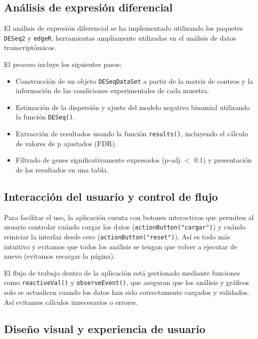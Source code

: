 \subsection{Análisis de expresión diferencial}

El análisis de expresión diferencial se ha implementado utilizando los paquetes \texttt{DESeq2} y \texttt{edgeR}, herramientas 
ampliamente utilizadas en el análisis de datos transcriptómicos. \newline

El proceso incluye los siguientes pasos:

\begin{itemize}
\item Construcción de un objeto \texttt{DESeqDataSet} a partir de la matriz de conteos y la información de las condiciones 
experimentales de cada muestra.
\item Estimación de la dispersión y ajuste del modelo negativo binomial utilizando la función \texttt{DESeq()}.
\item Extracción de resultados usando la función \texttt{results()}, incluyendo el cálculo de valores de p ajustados (FDR).
\item Filtrado de genes significativamente expresados (p-adj $<$ 0.1) y presentación de los resultados en una tabla.
\end{itemize}

\subsection{Interacción del usuario y control de flujo}

Para facilitar el uso, la aplicación cuenta con botones interactivos que permiten al usuario controlar cuándo cargar los 
datos (\texttt{actionButton("cargar")}) y cuándo reiniciar la interfaz desde cero (\texttt{actionButton("reset")}). Así es 
todo más intuitivo y evitamos que todos los análisis se tengan que volver a ejecutar de nuevo (evitamos recargar la página). \newline

El flujo de trabajo dentro de la aplicación está gestionado mediante funciones como \texttt{reactiveVal()} y \texttt{observeEvent()}, 
que aseguran que los análisis y gráficos solo se actualicen cuando los datos han sido correctamente cargados y validados. Así evitamos 
cálculos innecesarios o errores.

\subsection{Diseño visual y experiencia de usuario}

